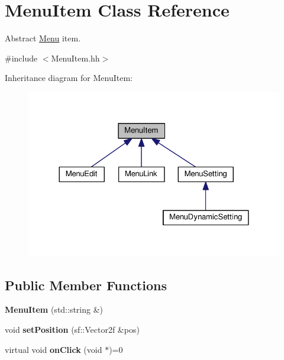 \hypertarget{classMenuItem}{}\section{Menu\+Item Class Reference}
\label{classMenuItem}


Abstract \hyperlink{classMenu}{Menu} item.  




{\ttfamily \#include $<$Menu\+Item.\+hh$>$}



Inheritance diagram for Menu\+Item\+:
\nopagebreak
\begin{figure}[H]
\begin{center}
\leavevmode
\includegraphics[width=324pt]{classMenuItem__inherit__graph}
\end{center}
\end{figure}
\subsection*{Public Member Functions}
\begin{DoxyCompactItemize}
\item 
{\bfseries Menu\+Item} (std\+::string \&)\hypertarget{classMenuItem_a07f74e3fc83f6a4aaef6675aef486e1d}{}\label{classMenuItem_a07f74e3fc83f6a4aaef6675aef486e1d}

\item 
void {\bfseries set\+Position} (sf\+::\+Vector2f \&pos)\hypertarget{classMenuItem_a58789909833868a64deb1b3a81f35ff4}{}\label{classMenuItem_a58789909833868a64deb1b3a81f35ff4}

\item 
virtual void {\bfseries on\+Click} (void $\ast$)=0\hypertarget{classMenuItem_a8be7ee76fe079bc6fee75d3d84a9db91}{}\label{classMenuItem_a8be7ee76fe079bc6fee75d3d84a9db91}

\end{DoxyCompactItemize}
